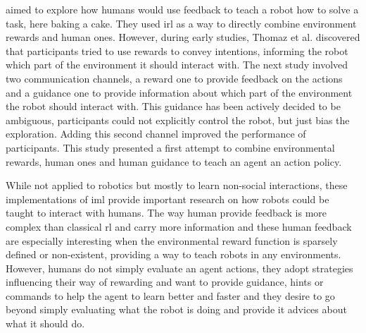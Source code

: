 \cite{thomaz2008teachable} aimed to explore how humans would use feedback to teach a robot how to solve a task, here baking a cake. They used \acrfull{irl} as a way to directly combine environment rewards and human ones. However, during early studies, Thomaz et al. discovered that participants tried to use rewards to convey intentions, informing the robot which part of the environment it should interact with. The next study involved two communication channels, a reward one to provide feedback on the actions and a guidance one to provide information about which part of the environment the robot should interact with. This guidance has been actively decided to be ambiguous, participants could not explicitly control the robot, but just bias the exploration. Adding this second channel improved the performance of participants. This study presented a first attempt to combine environmental rewards, human ones and human guidance to teach an agent an action policy.



While not applied to robotics but mostly to learn non-social interactions, these implementations of \gls{iml} provide important research on how robots could be taught to interact with humans. The way human provide feedback is more complex than classical \gls{rl} and carry more information and these human feedback are especially interesting when the environmental reward function is sparsely defined or non-existent, providing a way to teach robots in any environments. However, humans do not simply evaluate an agent actions, they adopt strategies influencing their way of rewarding and want to provide guidance, hints or commands to help the agent to learn better and faster and they desire to go beyond simply evaluating what the robot is doing and provide it advices about what it should do.

